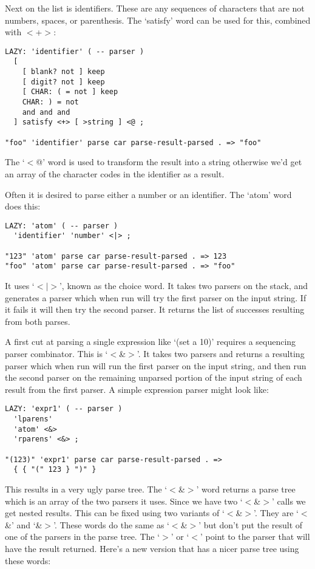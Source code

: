 Next on the list is identifiers. These are any sequences of characters
that are not numbers, spaces, or parenthesis. The `satisfy' word can
be used for this, combined with $<$+$>$:

\begin{verbatim}
LAZY: 'identifier' ( -- parser )
  [ 
    [ blank? not ] keep 
    [ digit? not ] keep 
    [ CHAR: ( = not ] keep 
    CHAR: ) = not 
    and and and    
  ] satisfy <+> [ >string ] <@ ;

"foo" 'identifier' parse car parse-result-parsed . => "foo"
\end{verbatim}

The `$<$@' word is used to transform the result into a string otherwise
we'd get an array of the character codes in the identifier as a
result.

Often it is desired to parse either a number or an identifier. The
`atom' word does this:

\begin{verbatim}
LAZY: 'atom' ( -- parser )
  'identifier' 'number' <|> ;

"123" 'atom' parse car parse-result-parsed . => 123
"foo" 'atom' parse car parse-result-parsed . => "foo"
\end{verbatim}

It uses `$<|>$', known as the choice word. It takes two parsers on the
stack, and generates a parser which when run will try the first parser
on the input string. If it fails it will then try the second
parser. It returns the list of successes resulting from both parses.

A first cut at parsing a single expression like `(set a 10)' requires
a sequencing parser combinator. This is `$<$\&$>$'. It takes two parsers
and returns a resulting parser which when run will run the first
parser on the input string, and then run the second parser on the
remaining unparsed portion of the input string of each result from the
first parser. A simple expression parser might look like:

\begin{verbatim}
LAZY: 'expr1' ( -- parser )
  'lparens' 
  'atom' <&>
  'rparens' <&> ;

"(123)" 'expr1' parse car parse-result-parsed . =>
  { { "(" 123 } ")" }
\end{verbatim}

This results in a very ugly parse tree. The `$<$\&$>$' word returns a parse
tree which is an array of the two parsers it uses. Since we have two
`$<$\&$>$' calls we get nested results. This can be fixed using two
variants of `$<$\&$>$'. They are `$<$\&' and `\&$>$'. These words do the same as
`$<$\&$>$' but don't put the result of one of the parsers in the parse
tree. The `$>$' or `$<$' point to the parser that will have the result
returned. Here's a new version that has a nicer parse tree using these
words:

